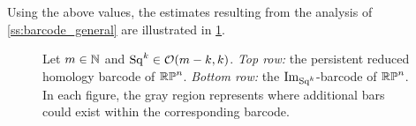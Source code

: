 Using the above values, the estimates resulting from the analysis of \cref{ss:barcode_general} are illustrated in \cref{fig:sq barcodes}.

\begin{figure}
	\centering
	
	\caption{Let $m \in \mathbb{N}$ and $\mathrm{Sq}^k \in \mathcal{O}(m-k, k)$.
        \emph{Top row:} the persistent reduced homology barcode of $\mathbb{RP}^n$.
		\emph{Bottom row:} the $\operatorname{Im}_{\mathrm{Sq}^k}$-barcode of $\mathbb{RP}^n$.
        In each figure, the gray region represents where additional bars could exist within the corresponding barcode.
	}
	\label{fig:sq barcodes}
\end{figure}